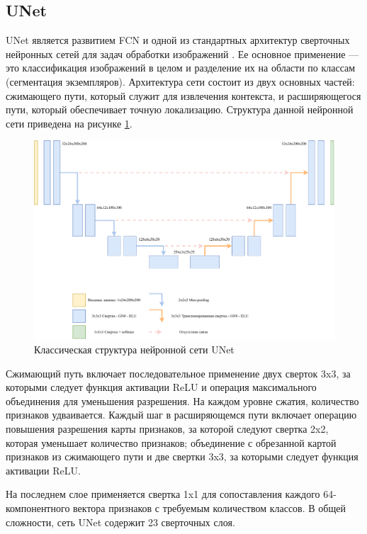\subsection{UNet}

UNet является развитием FCN и одной из стандартных архитектур сверточных нейронных сетей для задач обработки изображений \cite{unets}. Ее основное применение --- это классификация изображений в целом и разделение их на области по классам (сегментация экземпляров). Архитектура сети состоит из двух основных частей: сжимающего пути, который служит для извлечения контекста, и расширяющегося пути, который обеспечивает точную локализацию. Структура данной нейронной сети приведена на рисунке \ref{fig:unet_classic}.

\begin{figure}[h!btp]
	\centering
	\includegraphics[scale = 0.65]{inc/analysis/unet.pdf}
	\caption{Классическая структура нейронной сети UNet}
	\label{fig:unet_classic}	
\end{figure}

Сжимающий путь включает последовательное применение двух сверток 3x3, за которыми следует функция активации ReLU и операция максимального объединения для уменьшения разрешения. На каждом уровне сжатия, количество признаков удваивается. Каждый шаг в расширяющемся пути включает операцию повышения разрешения карты признаков, за которой следуют свертка 2x2, которая уменьшает количество признаков; объединение с обрезанной картой признаков из сжимающего пути и две свертки 3x3, за которыми следует функция активации ReLU.

На последнем слое применяется свертка 1x1 для сопоставления каждого 64-компонентного вектора признаков с требуемым количеством классов. В общей сложности, сеть UNet содержит 23 сверточных слоя.


